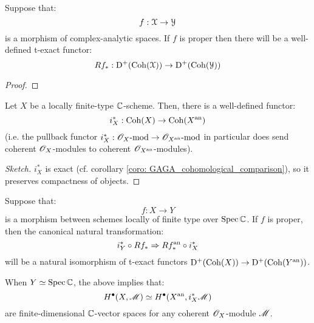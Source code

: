             \begin{lemma} \label{lemma: pushforwards_of_analytic_coherent_modules}
                Suppose that:
                    $$f: \mathcal{X} \to \mathcal{Y}$$
                is a morphism of complex-analytic spaces. If $f$ is proper then there will be a well-defined t-exact functor:
                    $$Rf_*: \mathrm{D}^+(\mathrm{Coh}(\mathcal{X})) \to \mathrm{D}^+(\mathrm{Coh}(\mathcal{Y}))$$
            \end{lemma}
                \begin{proof}
                    
                \end{proof}
            \begin{lemma} \label{lemma: absolute_analytification_of_coherent_modules}
                Let $X$ be a locally finite-type $\mathbb{C}$-scheme. Then, there is a well-defined functor:
                    $$i_X^*: \mathrm{Coh}(X) \to \mathrm{Coh}(X^{\mathrm{an}})$$
                (i.e. the pullback functor $i_X^*: \mathscr{O}_X\text{-}\mathrm{mod} \to \mathscr{O}_{X^{\mathrm{an}}}\text{-}\mathrm{mod}$ in particular does send coherent $\mathscr{O}_X$-modules to coherent $\mathscr{O}_{X^{\mathrm{an}}}$-modules).
            \end{lemma}
                \begin{proof}[Sketch]
                    $i_X^*$ is exact (cf. corollary \ref{coro: GAGA_cohomological_comparison}), so it preserves compactness of objects. 
                \end{proof}
            \begin{theorem} \label{theorem: relative_analytification_of_coherent_modules}
                Suppose that:
                    $$f: X \to Y$$
                is a morphism between schemes locally of finite type over $\operatorname{Spec} \mathbb{C}$. If $f$ is proper, then the canonical natural transformation:
                    $$i_Y^* \circ R f_* \Rightarrow R f^{\mathrm{an}}_* \circ i_X^*$$
                will be a natural isomorphism of t-exact functors $\mathrm{D}^+(\mathrm{Coh}(X)) \to \mathrm{D}^+(\mathrm{Coh}(Y^{\mathrm{an}}))$.

                When $Y \simeq \operatorname{Spec} \mathbb{C}$, the above implies that:
                    $$H^{\bullet}(X, \mathscr{M}) \simeq H^{\bullet}(X^{\mathrm{an}}, i_X^*\mathscr{M})$$
                are finite-dimensional $\mathbb{C}$-vector spaces for any coherent $\mathscr{O}_X$-module $\mathscr{M}$.
            \end{theorem}
